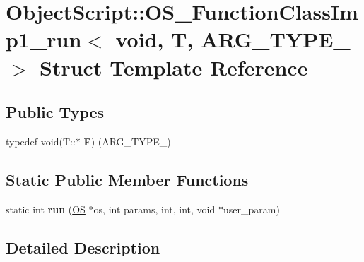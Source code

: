 \hypertarget{struct_object_script_1_1_o_s___function_class_imp1__run_3_01void_00_01_t_00_01_01_01_a_r_g___t_y_p_e__1_01_4}{}\section{Object\+Script\+:\+:O\+S\+\_\+\+Function\+Class\+Imp1\+\_\+run$<$ void, T, A\+R\+G\+\_\+\+T\+Y\+P\+E\+\_ $>$ Struct Template Reference}
\label{struct_object_script_1_1_o_s___function_class_imp1__run_3_01void_00_01_t_00_01_01_01_a_r_g___t_y_p_e__1_01_4}
\subsection*{Public Types}
\begin{DoxyCompactItemize}
\item 
typedef void(T\+::$\ast$ {\bfseries F}) (A\+R\+G\+\_\+\+T\+Y\+P\+E\+\_)\hypertarget{struct_object_script_1_1_o_s___function_class_imp1__run_3_01void_00_01_t_00_01_01_01_a_r_g___t_y_p_e__1_01_4_ae5c652f29a8098cf071c7f9a05474ed1}{}\label{struct_object_script_1_1_o_s___function_class_imp1__run_3_01void_00_01_t_00_01_01_01_a_r_g___t_y_p_e__1_01_4_ae5c652f29a8098cf071c7f9a05474ed1}

\end{DoxyCompactItemize}
\subsection*{Static Public Member Functions}
\begin{DoxyCompactItemize}
\item 
static int {\bfseries run} (\hyperlink{class_object_script_1_1_o_s}{OS} $\ast$os, int params, int, int, void $\ast$user\+\_\+param)\hypertarget{struct_object_script_1_1_o_s___function_class_imp1__run_3_01void_00_01_t_00_01_01_01_a_r_g___t_y_p_e__1_01_4_ad4bf943ed50abc8b4f091cceb85357d5}{}\label{struct_object_script_1_1_o_s___function_class_imp1__run_3_01void_00_01_t_00_01_01_01_a_r_g___t_y_p_e__1_01_4_ad4bf943ed50abc8b4f091cceb85357d5}

\end{DoxyCompactItemize}


\subsection{Detailed Description}
